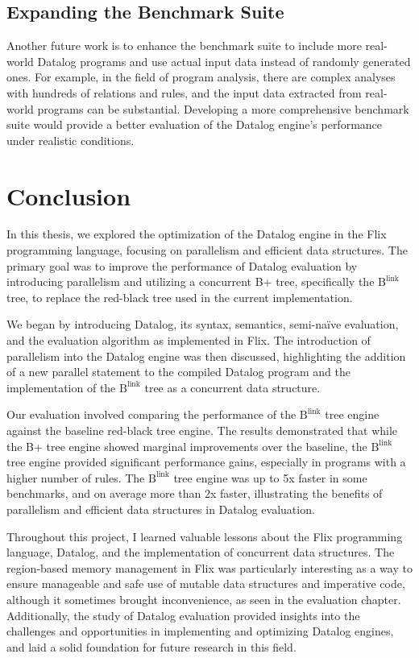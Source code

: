 \documentclass[11pt]{report}
\theoremstyle{definition}
\begin{document}
\section{Expanding the Benchmark Suite}

Another future work is to enhance the benchmark suite to include more real-world Datalog programs and use actual input data instead of randomly generated ones. For example, in the field of program analysis, there are complex analyses with hundreds of relations and rules, and the input data extracted from real-world programs can be substantial. Developing a more comprehensive benchmark suite would provide a better evaluation of the Datalog engine's performance under realistic conditions.

\chapter{Conclusion}
\label{ch:conclusion}

In this thesis, we explored the optimization of the Datalog engine in the Flix programming language, focusing on parallelism and efficient data structures. The primary goal was to improve the performance of Datalog evaluation by introducing parallelism and utilizing a concurrent B+ tree, specifically the $\text{B}^{\text{link}}$ tree, to replace the red-black tree used in the current implementation.

We began by introducing Datalog, its syntax, semantics, semi-naïve evaluation, and the evaluation algorithm as implemented in Flix. The introduction of parallelism into the Datalog engine was then discussed, highlighting the addition of a new parallel statement to the compiled Datalog program and the implementation of the $\text{B}^{\text{link}}$ tree as a concurrent data structure.

Our evaluation involved comparing the performance of the $\text{B}^{\text{link}}$ tree engine against the baseline red-black tree engine. The results demonstrated that while the B+ tree engine showed marginal improvements over the baseline, the $\text{B}^{\text{link}}$ tree engine provided significant performance gains, especially in programs with a higher number of rules. The $\text{B}^{\text{link}}$ tree engine was up to 5x faster in some benchmarks, and on average more than 2x faster, illustrating the benefits of parallelism and efficient data structures in Datalog evaluation.

Throughout this project, I learned valuable lessons about the Flix programming language, Datalog, and the implementation of concurrent data structures. The region-based memory management in Flix was particularly interesting as a way to ensure manageable and safe use of mutable data structures and imperative code, although it sometimes brought inconvenience, as seen in the evaluation chapter. Additionally, the study of Datalog evaluation provided insights into the challenges and opportunities in implementing and optimizing Datalog engines, and laid a solid foundation for future research in this field.
\end{document}
